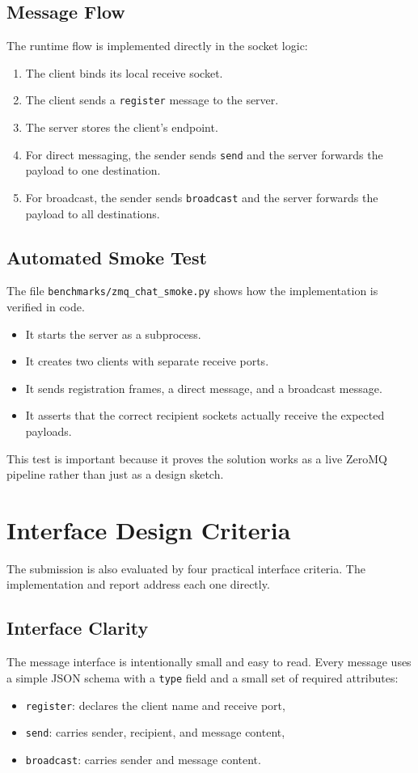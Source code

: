 \documentclass[a4paper,12pt]{article}
\begin{document}
\subsection{Message Flow}
The runtime flow is implemented directly in the socket logic:
\begin{enumerate}[leftmargin=1.4em]
  \item The client binds its local receive socket.
  \item The client sends a \texttt{register} message to the server.
  \item The server stores the client's endpoint.
  \item For direct messaging, the sender sends \texttt{send} and the server forwards the payload to one destination.
  \item For broadcast, the sender sends \texttt{broadcast} and the server forwards the payload to all destinations.
\end{enumerate}

\subsection{Automated Smoke Test}
The file \texttt{benchmarks/zmq\_chat\_smoke.py} shows how the implementation is verified in code.
\begin{itemize}[leftmargin=1.4em]
  \item It starts the server as a subprocess.
  \item It creates two clients with separate receive ports.
  \item It sends registration frames, a direct message, and a broadcast message.
  \item It asserts that the correct recipient sockets actually receive the expected payloads.
\end{itemize}

This test is important because it proves the solution works as a live ZeroMQ pipeline rather than just as a design sketch.

\section{Interface Design Criteria}
The submission is also evaluated by four practical interface criteria. The implementation and report address each one directly.

\subsection{Interface Clarity}
The message interface is intentionally small and easy to read. Every message uses a simple JSON schema with a \texttt{type} field and a small set of required attributes:
\begin{itemize}[leftmargin=1.4em]
  \item \texttt{register}: declares the client name and receive port,
  \item \texttt{send}: carries sender, recipient, and message content,
  \item \texttt{broadcast}: carries sender and message content.
\end{itemize}
\end{document}
